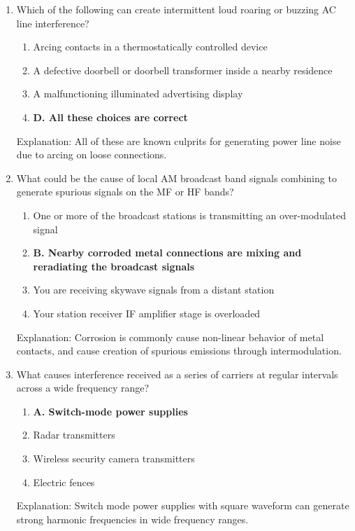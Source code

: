 \begin{enumerate}
        \item Which of the following can create intermittent loud roaring or buzzing AC line interference?
        \begin{enumerate}
        \item  Arcing contacts in a thermostatically controlled device
        \item  A defective doorbell or doorbell transformer inside a nearby residence
        \item  A malfunctioning illuminated advertising display
       \item \textbf{D. All these choices are correct}
       \end{enumerate}
        \textcolor{myred}{Explanation:}
       All of these are known culprits for generating power line noise due to arcing on loose connections.
       
    \item What could be the cause of local AM broadcast band signals combining to generate spurious signals on the MF or HF bands?
         \begin{enumerate}
         \item  One or more of the broadcast stations is transmitting an over-modulated signal
          \item \textbf{B. Nearby corroded metal connections are mixing and reradiating the broadcast signals}
         \item  You are receiving skywave signals from a distant station
      \item  Your station receiver IF amplifier stage is overloaded
      \end{enumerate}
   \textcolor{myred}{Explanation:}
      Corrosion is commonly cause non-linear behavior of metal contacts, and cause creation of spurious emissions through intermodulation.
      
      \item What causes interference received as a series of carriers at regular intervals across a wide frequency range?
       \begin{enumerate}
        \item \textbf{A. Switch-mode power supplies}
       \item  Radar transmitters
        \item  Wireless security camera transmitters
      \item  Electric fences
       \end{enumerate}
     \textcolor{myred}{Explanation:}
     Switch mode power supplies with square waveform can generate strong harmonic frequencies in wide frequency ranges.
     

\end{enumerate}
